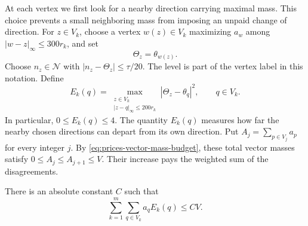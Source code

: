 At each vertex we first look for a nearby direction carrying maximal
mass. This choice prevents a small neighboring mass from imposing an
unpaid change of direction. For $z\in V_k$, choose a vertex
$w(z)\in V_k$ maximizing $a_w$ among
$|w-z|_{\infty}\le300r_k$, and set
\[
 \Theta_z=\theta_{w(z)}.
\]
Choose $n_z\in\mathcal N$ with $|n_z-\Theta_z|\le\tau/20$.
The level is part of the vertex label in this notation. Define
\[
 E_k(q)=
 \max_{\substack{z\in V_k\\|z-q|_{\infty}\le200r_k}}
       |\Theta_z-\theta_q|^2,
 \qquad q\in V_k.
\]
In particular, $0\le E_k(q)\le4$. The quantity $E_k(q)$ measures
how far the nearby chosen directions can depart from its own
direction. Put $A_j=\sum_{p\in V_j}a_p$ for every integer $j$.
By \eqref{eq:prices-vector-mass-budget}, these total vector masses
satisfy $0\le A_j\le A_{j+1}\le V$. Their increase pays the
weighted sum of the disagreements.

\begin{lemma}
\label{lem:labels-neighbors}
There is an absolute constant $C$ such that
\begin{equation}
 \sum_{k=1}^m\sum_{q\in V_k}a_q E_k(q)\le C V.
 \label{eq:neighbor-budget}
\end{equation}
\end{lemma}

